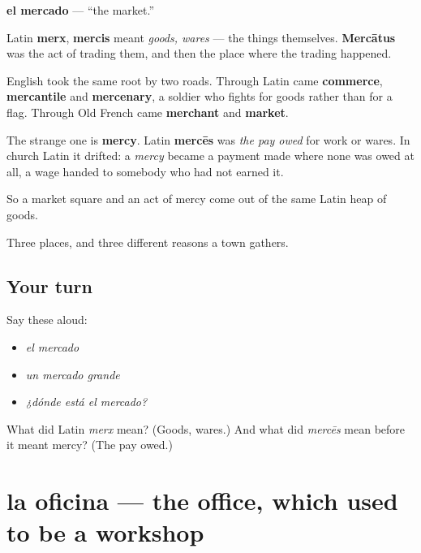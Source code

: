 \begin{cousinweb}
\textbf{el mercado} — \textquotedblleft{}the market.\textquotedblright{}

Latin \textbf{merx}, \textbf{mercis} meant \emph{goods, wares} — the things themselves. \textbf{Mercātus} was the act of trading them, and then the place where the trading happened.

English took the same root by two roads. Through Latin came \textbf{commerce}, \textbf{mercantile} and \textbf{mercenary}, a soldier who fights for goods rather than for a flag. Through Old French came \textbf{merchant} and \textbf{market}.

The strange one is \textbf{mercy}. Latin \textbf{mercēs} was \emph{the pay owed} for work or wares. In church Latin it drifted: a \emph{mercy} became a payment made where none was owed at all, a wage handed to somebody who had not earned it.

So a market square and an act of mercy come out of the same Latin heap of goods.
\end{cousinweb}

\begin{grammarlens}[title={What you've built}]
Three places, and three different reasons a town gathers.
\end{grammarlens}

\subsection*{Your turn}
Say these aloud:

\begin{itemize}
\raggedright
  \item \emph{el mercado}
  \item \emph{un mercado grande}
  \item \emph{¿dónde está el mercado?}
\end{itemize}

\begin{tcolorbox}[breakable,colback=teal!4,colframe=teal!35!black,title={Before you move on}]
What did Latin \emph{merx} mean? (Goods, wares.) And what did \emph{mercēs} mean before it meant mercy? (The pay owed.)
\end{tcolorbox}
\section[la oficina]{la oficina — the office, which used to be a workshop}

\label{lesson:ES-C346-oficina}



